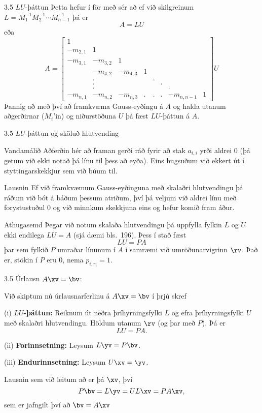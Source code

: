\begin{frame}{3.5 $LU$-þáttun}
 Þetta hefur í för með sér að ef við skilgreinum 
$L = M_1^{-1} M_2^{-1} \cdots M_{n-1}^{-1}$ \pause þá er
$$
A = LU
$$\pause
eða
$$
A = \left[\begin{array}{cccccccc}
1 &   &   &   &   &   &   &  \\
-m_{2,1} & 1 &   &   &   &   &   &  \\
-m_{3,1} & -m_{3,2} & 1 &   &   &   &   &  \\
  & -m_{4,2} & -m_{4,3} & 1 &   &   &   &  \\
  & . &   &   & . &   &   &  \\
  & . &   &   &   & . &   &  \\
  & . &   &   &   &   & . &  \\
-m_{n,1} & -m_{n,2} & -m_{n,3} & . & . & . & -m_{n,n-1} & 1
   \end{array}\right] U
$$ \pause
Þannig að með því að framkvæma Gauss-eyðingu á $A$ og halda utanum aðgerðirnar ($M_i$'in)
og niðurstöðuna $U$ þá fæst $LU$-þáttun á $A$.
\end{frame}

\begin{frame}{3.5 $LU$-þáttun og sköluð hlutvending}
\begin{block}{Vandamálið}
  Aðferðin hér að framan gerði ráð fyrir að stak $a_{i,i}$ yrði aldrei 0 (þá
getum við ekki notað þá línu til þess að eyða). Eins hugsuðum við ekkert út í styttingarskekkjur
sem við búum til. 
\end{block}

\begin{block}{Lausnin} 
 Ef við framkvæmum Gauss-eyðinguna með skalaðri hlutvendingu þá ráðum við bót á báðum þessum
atriðum, því þá veljum við aldrei línu með forystustuðul 0 og við minnkum skekkjuna eins og hefur
komið fram áður.
\end{block}

\begin{block}{Athugasemd}
 Þegar við notum skalaða hlutvendingu þá uppfylla fylkin $L$ og $U$ ekki endilega $LU=A$ 
(sjá dæmi bls.~196). \pause Þess í stað fæst 
  $$LU =PA$$
þar sem fylkið $P$ umraðar línunum í $A$ í samræmi við umröðunarvigrinn $\rv$. \pause
Það er, stökin í $P$ eru 0, nema $p_{i,r_i} = 1$.
\end{block}
\end{frame}


\begin{frame}{3.5 Úrlausn $A\xv=\bv$:} 

Við skiptum nú úrlausnarferlinu á $A\xv=\bv$ í þrjú skref

(i) {\bf $LU$-þáttun:}  Reiknum út neðra þríhyrningsfylki $L$  og efra þríhyrningsfylki $U$ með 
skalaðri hlutvendingu. Höldum utanum $\rv$ (og þar með $P$). Þá er 
$$
LU=PA.
$$\pause

(ii) {\bf Forinnsetning:}  Leysum $L\yv=P\bv$.

(iii) {\bf Endurinnsetning:} Leysum $U\xv=\yv$.

Lausnin sem við leitum að er þá $\xv$, því
$$
P\bv = L\yv = UL\xv = PA\xv,
$$
sem er jafngilt því að $\bv=A\xv$
\end{frame}


